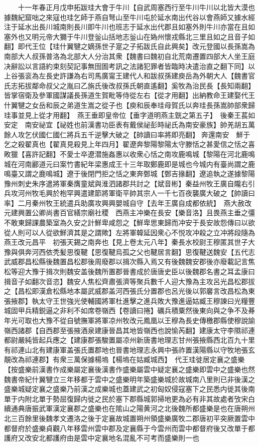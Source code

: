 　　十一年春正月戊申拓跋珪大會于牛川【自武周塞西行至牛川牛川以北皆大漠也據魏紀窟咄之來寇也珪乞師于燕自弩山至牛川屯於延水南出代谷以會燕師又據水經注于延水出長川城南則長川即牛川也班志于延水出代郡且如塞外則牛川亦當在且如塞外也又明元帝大獮于牛川登釡山括地志釡山在媯州懷戎縣北三里且如之且音子如翻】即代王位【珪什翼犍之嫡孫世子寔之子拓跋氏自此興矣】改元登國以長孫嵩為南部大人叔孫普洛為北部大人分治其衆【魏書曰魏初自北荒南遷置四部大人坐王庭决辭訟以言語約束刻契記事無囹圄考訊之法諸犯罪者皆臨時决遣治直之翻下同】以上谷張衮為左長史許謙為右司馬廣甯王建代人和跋叔孫建庾岳為外朝大人【魏書官氏志拓拔鄰命叔父之胤曰乙旃氏後改叔孫氏朝直遙翻】奚牧為治民長【長知兩翻】皆掌宿衛及參軍國謀議長孫道生賀毗等侍從左右【從才用翻】出納教命王建娶代王什翼犍之女岳和辰之弟道生嵩之從子也【庾和辰奉珪母賀氏以奔珪長孫嵩帥部衆歸珪事並見上從才用翻】　燕王垂即皇帝位【垂字道明燕主皝之第五子】　後秦王萇如安定　南安祕宜【祕姓也前漢書功臣表有戴侯祕彭時祕氏為南安豪族】帥羌胡五萬餘人攻乞伏國仁國仁將兵五千逆擊大破之【帥讀曰率將即亮翻】奔還南安　鮮于乞之殺翟真也【翟真見殺見上年四月】翟遼奔黎陽黎陽太守滕恬之甚愛信之恬之喜畋獵【喜許記翻】不愛士卒遼潜施姦惠以收衆心恬之南攻鹿鳴城【黎陽在河北鹿鳴城在河南酈道元曰案竹書紀年梁惠成王十三年取鄭鹿即是城也今城内有臺尚謂之鹿鳴臺又謂之鹿鳴城】遼于後閉門拒之恬之東奔鄄城【鄄吉掾翻】遼追執之遂據黎陽豫州刺史朱序遣將軍秦膺童斌與淮泗諸郡共討之【斌音彬】秦益州牧王廣自隴右引兵攻河州牧毛興於枹罕興遣建節將軍衛平帥其宗人一千七百夜襲廣大破之【帥讀曰率】二月秦州牧王統遣兵助廣攻興興嬰城自守【去年王廣自成都依統】　燕大赦改元建興置公卿尚書百官繕宗廟社稷　西燕主冲樂在長安【樂音洛】且畏燕主垂之彊不敢東歸課農築室為久安之計鮮卑咸怨之【鮮卑思東歸而冲安于長安故怨傳曰以欲從人則可以人從欲鮮濟其是之謂歟】左將軍韓延因衆心不悦攻冲殺之立冲將段隨為燕王改元昌平　初張天錫之南奔也【見上卷太元八年】秦長水校尉王穆匿其世子大豫與俱奔河西依秃髪思復鞬【思復鞬烏孤之父也鞬居言翻】思復鞬送魏安【五代志武威郡昌松縣後魏置昌松郡後周廢郡以揖次縣入焉又有後魏魏安郡後亦廢載記言焦松等迎大豫于揖次則魏安盖後魏所置郡晉書成於唐唐史臣以後魏郡名書之耳孟康曰揖音子如翻次音恣】魏安人焦松齊肅張濟等聚兵數千人迎大豫為主攻呂光昌松郡拔之【昌松即漢倉松縣地本屬武威郡盖河西張氏分置郡也呂光後以郭黁言改昌松為東張掖郡】執太守王世強光使輔國將軍杜進擊之進兵敗大豫進逼姑臧王穆諫曰光糧豐城固甲兵精鋭逼之非利不如席卷嶺西【卷讀曰捲】礪兵積粟然後東向與之争不及朞年光可取也大豫不從自號撫軍將軍凉州牧改元鳳凰以王穆為長史傳檄郡縣使穆說諭嶺西諸郡【自西郡至張掖酒泉建康晉昌其地皆嶺西也說愉芮翻】建康太守李隰祁連都尉嚴純皆起兵應之【建康郡張駿置屬凉州新唐書地理志甘州張掖縣西北百九十里有祁連山北有建康軍盖張氏置郡地也晉書地理志永興中張祚置漢陽縣以守牧地張玄靚改為祁連郡】有衆三萬保據楊塢【楊塢在姑臧城西】　代王珪徙居定襄之盛樂【按盛樂前漢書作成樂屬定襄後漢書作盛樂屬雲中疑定襄之盛樂即雲中之盛樂也然魏書帝紀什翼犍立三年移都于雲中之盛樂明年築盛樂城於故城南八里則已非後漢之盛樂城疑定襄之盛樂乃前漢之成樂城也蓋建武之初匈奴侵寇塞下之民悉内徙其後南單于内附北單于勢屈復歸内徙之民於塞下郡縣城郭掃地更為必有非其故處者攷宋白續通典唐振武軍漢定襄郡之盛樂也在隂山之陽黄河之北後魏所都盛樂是也在唐朔州北三百餘里後魏孝文遷洛之後于定襄故城置朔州領盛樂廣牧二郡唐初平突厥置雲中都督府於盛樂貞觀八年移雲州雲中郡及定襄縣于今雲州而雲中都督府後又改單于都護府又改安北都護府由是雲中定襄地名混亂不可考而盛樂則一也